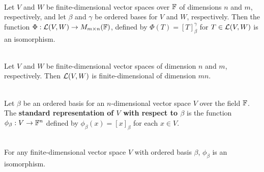 \begin{theorem}
	\hfill\\
	Let $V$ and $W$ be finite-dimensional vector spaces over $\mathbb{F}$ of dimensions $n$ and $m$, respectively, and let $\beta$ and $\gamma$ be ordered bases for $V$ and $W$, respectively. Then the function $\Phi: \mathcal{L}(V,W) \to M_{m \times n}(\mathbb{F})$, defined by $\Phi(T) = [T]_\beta^\gamma$ for $T \in \mathcal{L}(V,W)$ is an isomorphism.
\end{theorem}

\begin{corollary}\label{Corollary 2.7}
	\hfill\\
	Let $V$ and $W$ be finite-dimensional vector spaces of dimension $n$ and $m$, respectively. Then $\mathcal{L}(V,W)$ is finite-dimensional of dimension $mn$.
\end{corollary}

\begin{definition}
	\hfill\\
	Let $\beta$ be an ordered basis for an $n$-dimensional vector space $V$ over the field $\mathbb{F}$. The \textbf{standard representation of $V$ with respect to $\beta$} is the function $\phi_\beta: V \to \mathbb{F}^n$ defined by $\phi_\beta(x) = [x]_\beta$ for each $x \in V$.
\end{definition}

\begin{theorem}
	\hfill\\
	For any finite-dimensional vector space $V$ with ordered basis $\beta$, $\phi_\beta$ is an isomorphism.
\end{theorem}